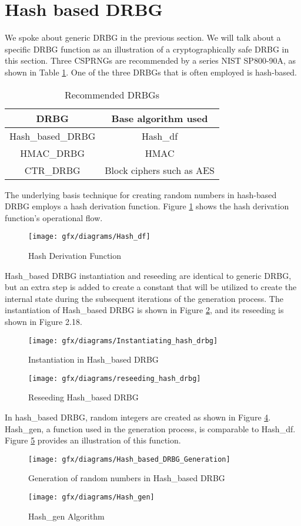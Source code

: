 \section{Hash based DRBG}
\label{sec:fundamentals:Hash_based_DRBG}
We spoke about generic DRBG in the previous section. We will talk about a specific DRBG function as an illustration of a cryptographically safe DRBG in this section. Three CSPRNGs are recommended by a series NIST SP800-90A, as shown in Table  \ref{table:2:2}. One of the three DRBGs that is often employed is hash-based. 
\begin{table}[htbp]
	\centering
	\begin{tabular}{||c c||} 
		\hline
		DRBG & Base algorithm used
		\\ [0.5ex] 
		\hline\hline
		Hash\_based\_DRBG & Hash\_df\\
		HMAC\_DRBG & HMAC\\
		CTR\_DRBG & Block ciphers such as AES\\
		\hline
	\end{tabular}
	\caption{Recommended DRBGs}
	\label{table:2:2}
\end{table}

The underlying basis technique for creating random numbers in hash-based DRBG employs a hash derivation function. Figure \ref{fig:2:16} shows the hash derivation function's operational flow.
\begin{figure}[htbp]
	\centering
	\texttt{[image: gfx/diagrams/Hash\_df]}
	\caption{Hash Derivation Function}
	\label{fig:2:16}
\end{figure}

Hash\_based DRBG instantiation and reseeding are identical to generic DRBG, but an extra step is added to create a constant that will be utilized to create the internal state during the subsequent iterations of the generation process. The instantiation of Hash\_based DRBG is shown in Figure \ref{fig:2:17}, and its reseeding is shown in Figure 2.18.
\begin{figure}[htbp]
	\centering
	\texttt{[image: gfx/diagrams/Instantiating\_hash\_drbg]}
	\caption{Instantiation in Hash\_based DRBG}
	\label{fig:2:17}
\end{figure}
\begin{figure}[htbp]
	\centering
	\texttt{[image: gfx/diagrams/reseeding\_hash\_drbg]}
	\caption{Reseeding Hash\_based DRBG}
	\label{fig:2:18}
\end{figure}

In hash\_based DRBG, random integers are created as shown in Figure \ref{fig:2:19}. Hash\_gen, a function used in the generation process, is comparable to Hash\_df. Figure \ref{fig:2:20} provides an illustration of this function.
\begin{figure}[htbp]
	\centering
	\texttt{[image: gfx/diagrams/Hash\_based\_DRBG\_Generation]}
	\caption{Generation of random numbers in Hash\_based DRBG}
	\label{fig:2:19}
\end{figure}
\begin{figure}[htbp]
	\centering
	\texttt{[image: gfx/diagrams/Hash\_gen]}
	\caption{Hash\_gen Algorithm}
	\label{fig:2:20}
\end{figure}